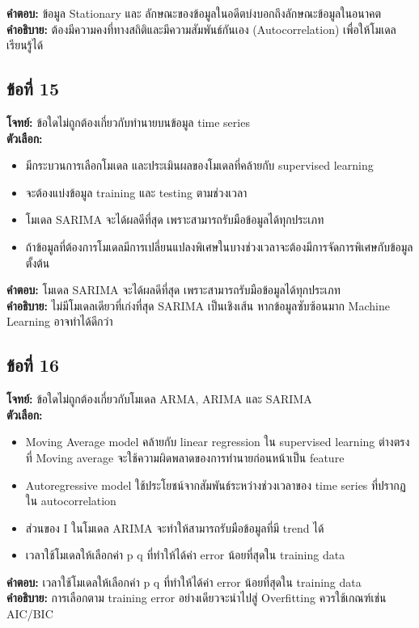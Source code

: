 \documentclass[12pt]{article}
\begin{document}
\textbf{คำตอบ:} ข้อมูล Stationary และ ลักษณะของข้อมูลในอดีตบ่งบอกถึงลักษณะข้อมูลในอนาคต\\
\textbf{คำอธิบาย:} ต้องมีความคงที่ทางสถิติและมีความสัมพันธ์กันเอง (Autocorrelation) เพื่อให้โมเดลเรียนรู้ได้

\subsection*{ข้อที่ 15}
\textbf{โจทย์:} ข้อใดไม่ถูกต้องเกี่ยวกับทำนายบนข้อมูล time series\\
\textbf{ตัวเลือก:}
\begin{itemize}
    \item มีกระบวนการเลือกโมเดล และประเมินผลของโมเดลที่คล้ายกับ supervised learning
    \item จะต้องแบ่งข้อมูล training และ testing ตามช่วงเวลา
    \item โมเดล SARIMA จะได้ผลดีที่สุด เพราะสามารถรับมือข้อมูลได้ทุกประเภท
    \item ถ้าข้อมูลที่ต้องการโมเดลมีการเปลี่ยนแปลงพิเศษในบางช่วงเวลาจะต้องมีการจัดการพิเศษกับข้อมูลตั้งต้น
\end{itemize}

\textbf{คำตอบ:} โมเดล SARIMA จะได้ผลดีที่สุด เพราะสามารถรับมือข้อมูลได้ทุกประเภท\\
\textbf{คำอธิบาย:} ไม่มีโมเดลเดียวที่เก่งที่สุด SARIMA เป็นเชิงเส้น หากข้อมูลซับซ้อนมาก Machine Learning อาจทำได้ดีกว่า

\subsection*{ข้อที่ 16}
\textbf{โจทย์:} ข้อใดไม่ถูกต้องเกี่ยวกับโมเดล ARMA, ARIMA และ SARIMA\\
\textbf{ตัวเลือก:}
\begin{itemize}
    \item Moving Average model คล้ายกับ linear regression ใน supervised learning ต่างตรงที่ Moving average จะใช้ความผิดพลาดของการทำนายก่อนหน้าเป็น feature
    \item Autoregressive model ใช้ประโยชน์จากสัมพันธ์ระหว่างช่วงเวลาของ time series ที่ปรากฏใน autocorrelation
    \item ส่วนของ I ในโมเดล ARIMA จะทำให้สามารถรับมือข้อมูลที่มี trend ได้
    \item เวลาใช้โมเดลให้เลือกค่า p q ที่ทำให้ได้ค่า error น้อยที่สุดใน training data
\end{itemize}

\textbf{คำตอบ:} เวลาใช้โมเดลให้เลือกค่า p q ที่ทำให้ได้ค่า error น้อยที่สุดใน training data\\
\textbf{คำอธิบาย:} การเลือกตาม training error อย่างเดียวจะนำไปสู่ Overfitting ควรใช้เกณฑ์เช่น AIC/BIC
\end{document}
